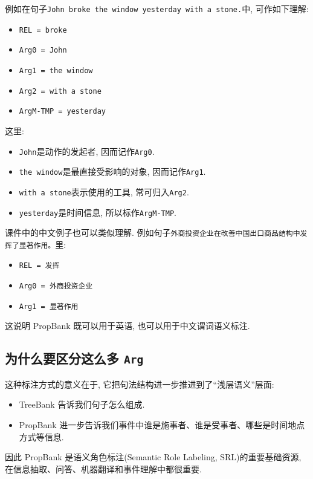 例如在句子\texttt{John broke the window yesterday with a stone.}中, 可作如下理解:

\begin{itemize}
\item \texttt{REL = broke}
\item \texttt{Arg0 = John}
\item \texttt{Arg1 = the window}
\item \texttt{Arg2 = with a stone}
\item \texttt{ArgM-TMP = yesterday}
\end{itemize}

这里:

\begin{itemize}
\item \texttt{John}是动作的发起者, 因而记作\texttt{Arg0}.
\item \texttt{the window}是最直接受影响的对象, 因而记作\texttt{Arg1}.
\item \texttt{with a stone}表示使用的工具, 常可归入\texttt{Arg2}.
\item \texttt{yesterday}是时间信息, 所以标作\texttt{ArgM-TMP}.
\end{itemize}

课件中的中文例子也可以类似理解.
例如句子\texttt{外商投资企业在改善中国出口商品结构中发挥了显著作用。}里:

\begin{itemize}
\item \texttt{REL = 发挥}
\item \texttt{Arg0 = 外商投资企业}
\item \texttt{Arg1 = 显著作用}
\end{itemize}

这说明 PropBank 既可以用于英语, 也可以用于中文谓词语义标注.

\subsection{为什么要区分这么多 \texttt{Arg}}


这种标注方式的意义在于, 它把句法结构进一步推进到了“浅层语义”层面:

\begin{itemize}
\item TreeBank 告诉我们句子怎么组成.
\item PropBank 进一步告诉我们事件中谁是施事者、谁是受事者、哪些是时间地点方式等信息.
\end{itemize}

因此 PropBank 是语义角色标注(Semantic Role Labeling, SRL)的重要基础资源,
在信息抽取、问答、机器翻译和事件理解中都很重要.

